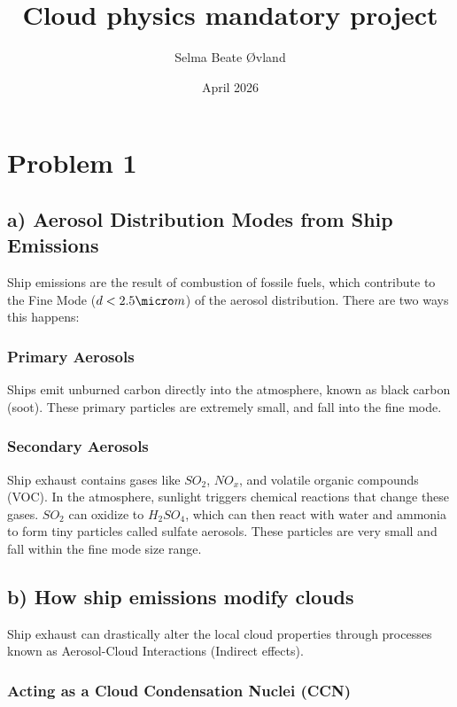 \documentclass{article}
\title{Cloud physics mandatory project}
\author{Selma Beate Øvland }
\date{April 2026}
\begin{document}
\maketitle


\section*{Problem 1}

\subsection*{a) Aerosol Distribution Modes from Ship Emissions}

Ship emissions are the result of combustion of fossile fuels, which contribute to the Fine Mode ($d < 2.5 \micro m$) of the aerosol distribution. There are two ways this happens: 

\subsubsection*{Primary Aerosols}

Ships emit unburned carbon directly into the atmosphere, known as black carbon (soot). These primary particles are extremely small, and fall into the fine mode. 

\subsubsection*{Secondary Aerosols}

Ship exhaust contains gases like $SO_2$, $NO_x$, and volatile organic compounds (VOC). In the atmosphere, sunlight triggers chemical reactions that change these gases. $SO_2$ can oxidize to $H_2SO_4$, which can then react with water and ammonia to form tiny particles called sulfate aerosols. These particles are very small and fall within the fine mode size range. 

\subsection*{b) How ship emissions modify clouds}

Ship exhaust can drastically alter the local cloud properties through processes known as Aerosol-Cloud Interactions (Indirect effects). 

\subsubsection*{Acting as a Cloud Condensation Nuclei (CCN)}
\end{document}
